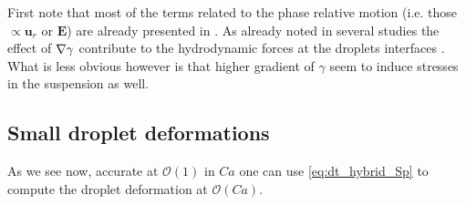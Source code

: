 First note that most of the terms related to the phase relative motion (i.e. those $\propto \textbf{u}_r$ or $\textbf{E}$) are already presented in \citet[Appendix A]{zhang1997momentum}. 
As already noted in several studies the effect of $\mathbf{\nabla} \gamma$ contribute to the hydrodynamic forces at the droplets interfaces \citep{Subramanian_1985}. 
What is less obvious however is that higher gradient of $\gamma$ seem to induce stresses in the suspension as well. 

 



\subsection{Small droplet deformations}

As we  see now, accurate at $\mathcal{O}(1)$ in $Ca$ one can use \ref{eq:dt_hybrid_Sp} to compute the droplet deformation at $\mathcal{O}(Ca)$. 

